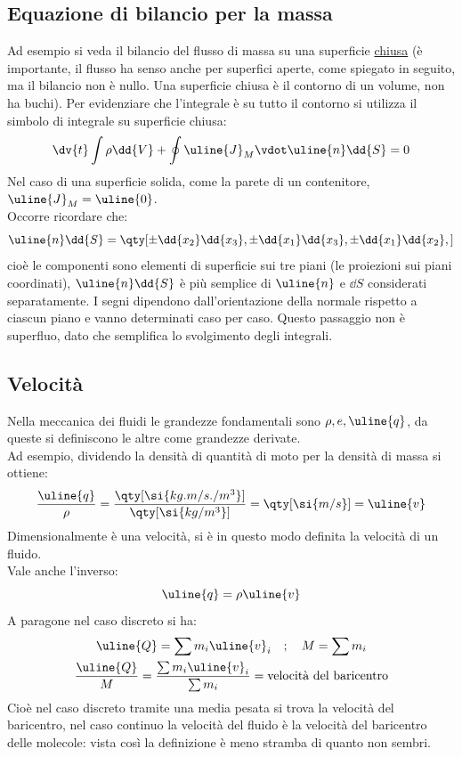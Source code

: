 \subsection{Equazione di bilancio per la massa}
Ad esempio si veda il bilancio del flusso di massa su una superficie \uline{chiusa} (è importante, il flusso ha senso anche per superfici aperte, come spiegato in seguito, ma il bilancio non è nullo. Una superficie chiusa è il contorno di un volume, non ha buchi).
Per evidenziare che l'integrale è su tutto il contorno si utilizza il simbolo di integrale su superficie chiusa:
%
	\begin{equation*}
		\dv{t} \int {\rho \dd{V}} + \oint {\uline{J}_M \vdot \uline{n} \dd{S}} = 0
	\end{equation*}
%
Nel caso di una superficie solida, come la parete di un contenitore, $\uline{J}_M = \uline{0}$.\\
Occorre ricordare che:
	\begin{equation*}
		\uline{n} \dd{S} = \qty[\pm \dd{x_2} \dd{x_3},\pm \dd{x_1} \dd{x_3},\pm \dd{x_1} \dd{x_2}, ]
	\end{equation*}
%
cioè le componenti sono elementi di superficie sui tre piani (le proiezioni sui piani coordinati), $\uline{n} \dd{S}$ è più semplice di $\uline{n}$ e $\dd{S}$ considerati separatamente. I segni dipendono dall'orientazione della normale rispetto a ciascun piano e vanno determinati caso per caso.
Questo passaggio non è superfluo, dato che semplifica lo svolgimento degli integrali.
%
\subsection{Velocità}
Nella meccanica dei fluidi le grandezze fondamentali sono $\rho, e, \uline{q}$, da queste si definiscono le altre come grandezze derivate. \\
Ad esempio, dividendo la densità di quantità di moto per la densità di massa si ottiene:
	\begin{equation*}
		\frac{\uline{q}}{\rho} = \frac{\qty[ \si{kg.m/s./m^3}] }{\qty[\si{kg /m^3}]} = \qty[\si{m/s}] = \uline{v}
	\end{equation*}
Dimensionalmente è una velocità, si è in questo modo definita la velocità di un fluido. \\
Vale anche l'inverso:
	\begin{equation*}
		\uline{q} = \rho \uline{v}
	\end{equation*}
%
A paragone nel caso discreto si ha:
	\begin{equation*}
		\begin{gathered}
			\uline{Q} = \sum m_i \uline{v}_i \quad ; \quad M = \sum m_i \\
			\frac{ \uline{Q} }{ M } = \frac{ \sum{ m_i \uline{v}_i } }{ \sum m_i } = \text{velocità del baricentro}
		\end{gathered}
	\end{equation*}
Cioè nel caso discreto tramite una media pesata si trova la velocità del baricentro, nel caso continuo la velocità del fluido è la velocità del baricentro delle molecole: vista così la definizione è meno stramba di quanto non sembri.
